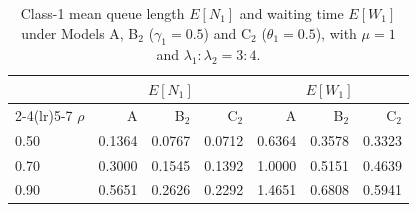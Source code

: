 \begin{table}[t]\centering
\caption{Class-1 mean queue length $E[N_1]$ and waiting time $E[W_1]$ under Models A, B$_2$ ($\gamma_1=0.5$) and C$_2$ ($\theta_1=0.5$), with $\mu=1$ and $\lambda_1{:}\lambda_2=3{:}4$.}
\label{tab:comp:EN_sweep}
\begin{tabular}{lrrrrrr}
\toprule
 & \multicolumn{3}{c}{$E[N_1]$} & \multicolumn{3}{c}{$E[W_1]$} \\
\cmidrule(lr){2-4}\cmidrule(lr){5-7}
$\rho$ & A & B$_2$ & C$_2$ & A & B$_2$ & C$_2$ \\
\midrule
0.50 & 0.1364 & 0.0767 & 0.0712 & 0.6364 & 0.3578 & 0.3323 \\
0.70 & 0.3000 & 0.1545 & 0.1392 & 1.0000 & 0.5151 & 0.4639 \\
0.90 & 0.5651 & 0.2626 & 0.2292 & 1.4651 & 0.6808 & 0.5941 \\
\bottomrule
\end{tabular}
\end{table}
